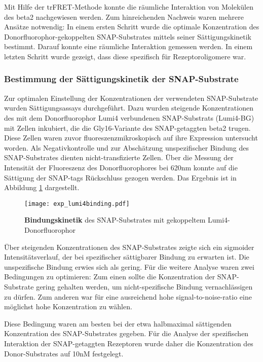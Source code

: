 Mit Hilfe der trFRET-Methode konnte die räumliche Interaktion von Molekülen des \gls{beta2} nachgewiesen werden. Zum hinreichenden Nachweis waren mehrere Ansätze notwendig: In einem ersten Schritt wurde die optimale Konzentration des Donorfluorophor-gekoppelten SNAP-Substrates mittels seiner Sättigungskinetik bestimmt. Darauf konnte eine räumliche Interaktion gemessen werden. In einem letzten Schritt wurde gezeigt, dass diese spezifisch für Rezeptoroligomere war.

\subsubsection{Bestimmung der Sättigungskinetik der SNAP-Substrate}
Zur optimalen Einstellung der Konzentrationen der verwendeten SNAP-Substrate wurden Sättigungsassays durchgeführt. Dazu wurden steigende Konzentrationen des mit dem Donorfluorophor Lumi4 verbundenen SNAP-Substrats (Lumi4-BG) mit Zellen inkubiert, die die Gly16-Variante des SNAP-getaggten \gls{beta2} trugen. Diese Zellen waren zuvor fluoreszenzmikroskopisch auf ihre Expression untersucht worden. Als Negativkontrolle und zur Abschätzung unspezifischer Bindung des SNAP-Substrates dienten nicht-transfizierte Zellen. Über die Messung der Intensität der Fluoreszenz des Donorfluorophores bei 620nm konnte auf die Sättigung der SNAP-tags Rückschluss gezogen werden. Das Ergebnis ist in Abbildung \ref{fig:lumi4binding} dargestellt.

\begin{figure}[htbp]
	\centering
    \texttt{[image: exp\_lumi4binding.pdf]}
    \caption{\textbf{Bindungskinetik} des SNAP-Substrates mit gekoppeltem Lumi4-Donorfluorophor}
    \label{fig:lumi4binding}
\end{figure}

Über steigenden Konzentrationen des SNAP-Substrates zeigte sich ein sigmoider Intensitätsverlauf, der bei spezifischer sättigbarer Bindung zu erwarten ist. Die unspezifische Bindung erwies sich als gering. Für die weitere Analyse waren zwei Bedingungen zu optimieren: Zum einen sollte die Konzentration der SNAP-Substrate gering gehalten werden, um nicht-spezifische Bindung vernachlässigen zu dürfen. Zum anderen war für eine ausreichend hohe signal-to-noise-ratio eine möglichst hohe Konzentration zu wählen.

Diese Bedingung waren am besten bei der etwa halbmaximal sättigenden Konzentration des SNAP-Substrates gegeben. Für die Analyse der spezifischen Interaktion der SNAP-getaggten Rezeptoren wurde daher die Konzentration des Donor-Substrates auf 10\si{\nano M} festgelegt.

